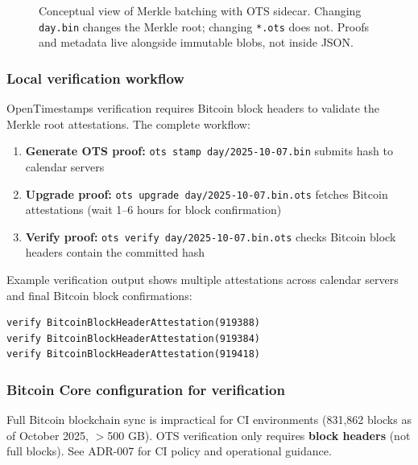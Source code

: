 \begin{figure}[h]
  \centering
  \caption{Conceptual view of Merkle batching with OTS sidecar. Changing \texttt{day.bin} changes the Merkle root; changing \texttt{*.ots} does not. Proofs and metadata live alongside immutable blobs, not inside JSON.}
  \label{fig:merkle-ots-sidecar}
\end{figure}

\subsubsection{Local verification workflow}
OpenTimestamps verification requires Bitcoin block headers to validate the Merkle root attestations.
The complete workflow:

\begin{enumerate}[nosep]
  \item \textbf{Generate OTS proof:} \texttt{ots stamp day/2025-10-07.bin} submits hash to calendar servers
  \item \textbf{Upgrade proof:} \texttt{ots upgrade day/2025-10-07.bin.ots} fetches Bitcoin attestations (wait 1--6 hours for block confirmation)
  \item \textbf{Verify proof:} \texttt{ots verify day/2025-10-07.bin.ots} checks Bitcoin block headers contain the committed hash
\end{enumerate}

Example verification output shows multiple attestations across calendar servers and final Bitcoin block confirmations:
\begin{verbatim}
verify BitcoinBlockHeaderAttestation(919388)
verify BitcoinBlockHeaderAttestation(919384)
verify BitcoinBlockHeaderAttestation(919418)
\end{verbatim}

\subsubsection{Bitcoin Core configuration for verification}
Full Bitcoin blockchain sync is impractical for CI environments (831,862 blocks as of October 2025, $>$500 GB). OTS verification only requires \textbf{block headers} (not full blocks).
See ADR-007 for CI policy and operational guidance.

